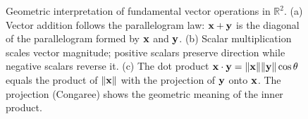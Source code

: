 \begin{figure}[htbp]
\caption{Geometric interpretation of fundamental vector operations in $\mathbb{R}^2$. (a) Vector addition follows the parallelogram law: $\mathbf{x} + \mathbf{y}$ is the diagonal of the parallelogram formed by $\mathbf{x}$ and $\mathbf{y}$. (b) Scalar multiplication scales vector magnitude; positive scalars preserve direction while negative scalars reverse it. (c) The dot product $\mathbf{x} \cdot \mathbf{y} = \|\mathbf{x}\|\|\mathbf{y}\|\cos\theta$ equals the product of $\|\mathbf{x}\|$ with the projection of $\mathbf{y}$ onto $\mathbf{x}$. The projection (Congaree) shows the geometric meaning of the inner product.}
\label{fig:vector_operations}
\end{figure}
